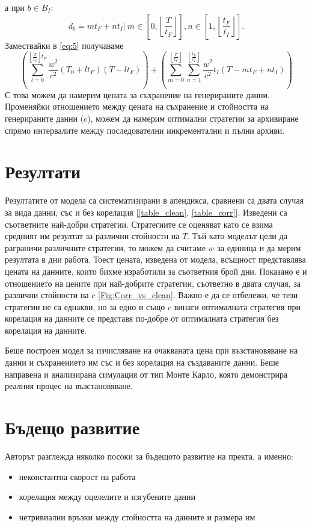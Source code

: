 \documentclass[11pt, a4paper]{article}
\theoremstyle{definition}
\begin{document}
			а при $b\in  B_I$:
			$$d_b= mt_F + nt_I|\ m\in \left[0, \left\lfloor\dfrac{T}{t_F}\right\rfloor\right],n\in \left[1, \left\lfloor\dfrac{t_F}{t_I}\right\rfloor\right].$$
			Замествайки в \ref{eq:5} получаваме
			\begin{equation}
				\left(\displaystyle\sum_{l = 0}^{\left\lfloor\frac{T}{t_F}\right\rfloor t_F}\dfrac{w^2}{c^2}(T_0 + lt_F)(T-lt_F)\right) + \left(\displaystyle\sum_{m = 0}^{\left\lfloor\frac{T}{t_F}\right\rfloor}\displaystyle\sum_{n = 1}^{\left\lfloor\frac{t_F}{t_I}\right\rfloor}\dfrac{w^2}{c^2}t_I(T-mt_F + nt_I)\right)
			\end{equation}
			С това можем да намерим цената за съхранение на генерираните данни. Променяйки отношението между цената на съхранение и стойността на генерираните данни ($c$), можем да намерим оптимални стратегии за архивиране спрямо интервалите между последователни инкрементални и пълни архиви.
	\section{Резултати}
			Резултатите от модела са систематизирани в апендикса, сравнени са двата случая за вида данни, със и без корелация [\ref{table_clean}, \ref{table_corr}]. Изведени са съответните най-добри стратегии. Стратегиите се оценяват като се взима средният им резултат за различни стойности на $T$. Тъй като моделът цели да раграничи различните стратегии, то можем да считаме $w$ за единица и да мерим резултата в дни работа. Тоест цената, изведена от модела, всъщност представлява цената на данните, които бихме изработили за съответния брой дни. Показано е и отношението на цените при най-добрите стратегии, съответно в двата случая, за различни стойности на $c$ \ref{Fig:Corr_vs_clean}. Важно е да се отбележи, че тези стратегии не са еднакви, но за едно и също $c$ винаги оптималната стратегия при корелация на данните се представя по-добре от оптималната стратегия без корелация на данните.\par 
			Беше построен модел за изчисляване на очакваната цена при възстановяване на данни и съхранението им със и без корелация на създаваните данни. Беше направена и анализирана симулация от тип Монте Карло, която демонстрира реалния процес на възстановяване.
	\section{Бъдещо развитие}
		Авторът разглежда няколко посоки за бъдещото развитие на пректа, а именно:
		\begin{itemize}
			\item неконстантна скорост на работа 
			\item корелация между оцелелите и изгубените данни
			\item нетривиални връзки между стойността на данните и размера им
		\end{itemize}
\end{document}
